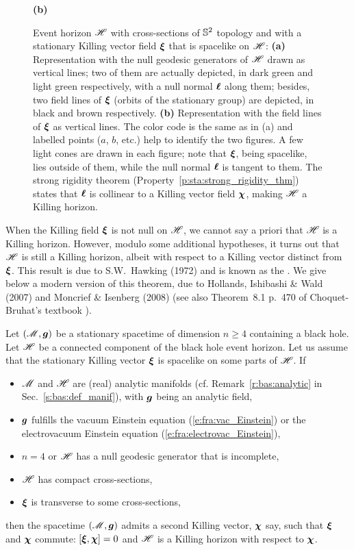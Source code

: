 \begin{figure}
{\textbf{\large (b)}}
\caption[]{\label{f:sta:rot_horizon} \footnotesize
Event horizon $\mathscr{H}$ with cross-sections of $\mathbb{S}^2$ topology
and with a stationary Killing vector field $\bm{\xi}$ that is
spacelike on $\mathscr{H}$:
\textbf{(a)} Representation with the null geodesic generators of $\mathscr{H}$ drawn as vertical
lines; two of them are actually depicted, in dark green and light green
respectively, with a null normal $\bm{\ell}$ along them; besides,
two field lines of $\bm{\xi}$
(orbits of the stationary group) are depicted, in black and brown
respectively.
\textbf{(b)} Representation with the field lines of $\bm{\xi}$ as vertical lines.
The color code is the same as in (a) and
labelled points ($a$, $b$, etc.) help to identify
the two figures. A few light cones are drawn in each figure; note that $\bm{\xi}$,
being spacelike, lies outside of them,
while the null normal $\bm{\ell}$ is tangent to them.
The strong rigidity theorem (Property~\ref{p:sta:strong_rigidity_thm}) states that
$\bm{\ell}$ is collinear to a Killing vector field $\bm{\chi}$, making $\mathscr{H}$
a Killing horizon.}
\end{figure}

When the Killing field $\bm{\xi}$ is not null on $\mathscr{H}$, we cannot say a priori
that $\mathscr{H}$ is a Killing horizon. However, modulo some additional hypotheses,
it turns out that $\mathscr{H}$ is still a Killing horizon, albeit with
respect to a Killing vector distinct from $\bm{\xi}$. This result is due to
S.W.~Hawking (1972)
\cite{Hawki72,HawkiE73} and is known as the
.
We give below a modern version of this theorem, due to
Hollands, Ishibashi \& Wald (2007) \cite{HollaIW07}
and Moncrief \& Isenberg (2008) \cite{MoncrI08} (see also
Theorem~8.1 p.~470 of Choquet-Bruhat's textbook \cite{Choqu09}).

\begin{prop}
\label{p:sta:strong_rigidity_thm}
Let $(\mathscr{M},\bm{g})$ be a stationary spacetime of dimension $n\geq 4$ containing a black
hole. Let $\mathscr{H}$ be a connected component of the black hole event horizon.
Let us assume that the stationary Killing vector $\bm{\xi}$
is spacelike on some parts of $\mathscr{H}$. If
\begin{itemize}
\item $\mathscr{M}$ and $\mathscr{H}$ are (real) analytic manifolds
(cf. Remark~\ref{r:bas:analytic} in Sec.~\ref{s:bas:def_manif}),
with $\bm{g}$ being an analytic field,
\item $\bm{g}$ fulfills the vacuum Einstein equation (\ref{e:fra:vac_Einstein})
or the electrovacuum Einstein equation (\ref{e:fra:electrovac_Einstein}),
\item $n=4$ or $\mathscr{H}$ has a null geodesic generator that is incomplete,
\item $\mathscr{H}$ has compact cross-sections,
\item $\bm{\xi}$ is transverse to some cross-sections,
\end{itemize}
then the spacetime $(\mathscr{M},\bm{g})$ admits a second Killing vector, $\bm{\chi}$
say, such that $\bm{\xi}$ and $\bm{\chi}$ commute: $[\bm{\xi}, \bm{\chi}] = 0$ and
$\mathscr{H}$ is a Killing horizon with respect to $\bm{\chi}$.
\end{prop}

